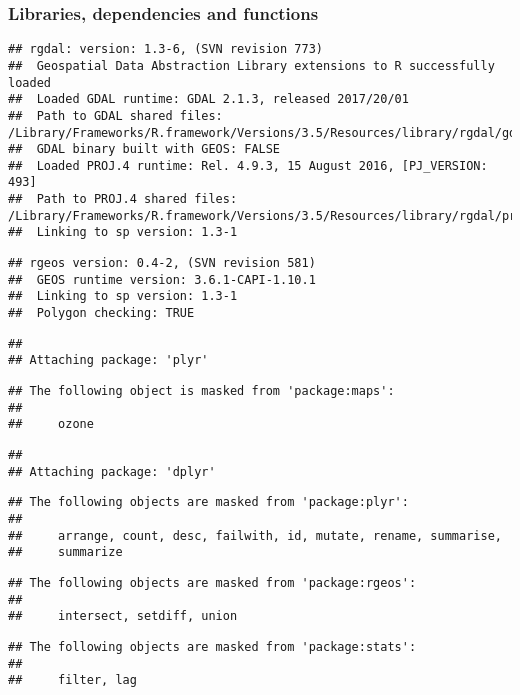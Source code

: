 \documentclass[]{article}
\begin{document}
\subsubsection{Libraries, dependencies and
functions}\label{libraries-dependencies-and-functions}

\begin{verbatim}
## rgdal: version: 1.3-6, (SVN revision 773)
##  Geospatial Data Abstraction Library extensions to R successfully loaded
##  Loaded GDAL runtime: GDAL 2.1.3, released 2017/20/01
##  Path to GDAL shared files: /Library/Frameworks/R.framework/Versions/3.5/Resources/library/rgdal/gdal
##  GDAL binary built with GEOS: FALSE 
##  Loaded PROJ.4 runtime: Rel. 4.9.3, 15 August 2016, [PJ_VERSION: 493]
##  Path to PROJ.4 shared files: /Library/Frameworks/R.framework/Versions/3.5/Resources/library/rgdal/proj
##  Linking to sp version: 1.3-1
\end{verbatim}

\begin{verbatim}
## rgeos version: 0.4-2, (SVN revision 581)
##  GEOS runtime version: 3.6.1-CAPI-1.10.1 
##  Linking to sp version: 1.3-1 
##  Polygon checking: TRUE
\end{verbatim}

\begin{verbatim}
## 
## Attaching package: 'plyr'
\end{verbatim}

\begin{verbatim}
## The following object is masked from 'package:maps':
## 
##     ozone
\end{verbatim}

\begin{verbatim}
## 
## Attaching package: 'dplyr'
\end{verbatim}

\begin{verbatim}
## The following objects are masked from 'package:plyr':
## 
##     arrange, count, desc, failwith, id, mutate, rename, summarise,
##     summarize
\end{verbatim}

\begin{verbatim}
## The following objects are masked from 'package:rgeos':
## 
##     intersect, setdiff, union
\end{verbatim}

\begin{verbatim}
## The following objects are masked from 'package:stats':
## 
##     filter, lag
\end{verbatim}
\end{document}
